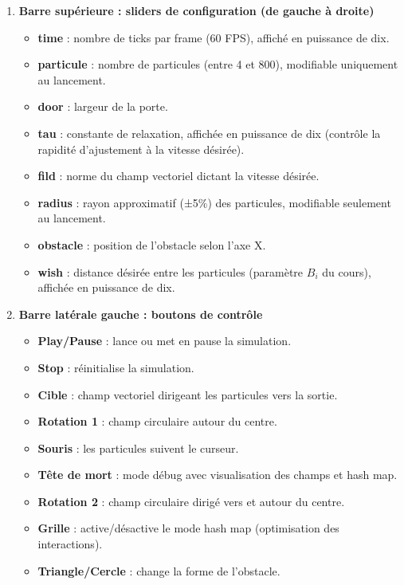 \documentclass[a4paper,12pt]{article}
\begin{document}
\begin{enumerate}
  \item \textbf{Barre supérieure : sliders de configuration (de gauche à droite)}
  \begin{itemize}
    \item \textbf{time} : nombre de ticks par frame (60 FPS), affiché en puissance de dix.
    \item \textbf{particule} : nombre de particules (entre 4 et 800), modifiable uniquement au lancement.
    \item \textbf{door} : largeur de la porte.
    \item \textbf{tau} : constante de relaxation, affichée en puissance de dix (contrôle la rapidité d’ajustement à la vitesse désirée).
    \item \textbf{fild} : norme du champ vectoriel dictant la vitesse désirée.
    \item \textbf{radius} : rayon approximatif (±5\%) des particules, modifiable seulement au lancement.
    \item \textbf{obstacle} : position de l’obstacle selon l’axe X.
    \item \textbf{wish} : distance désirée entre les particules (paramètre \( B_i \) du cours), affichée en puissance de dix.
  \end{itemize}

  \item \textbf{Barre latérale gauche : boutons de contrôle}
  \begin{itemize}
    \item \textbf{Play/Pause} : lance ou met en pause la simulation.
    \item \textbf{Stop} : réinitialise la simulation.
    \item \textbf{Cible} : champ vectoriel dirigeant les particules vers la sortie.
    \item \textbf{Rotation 1} : champ circulaire autour du centre.
    \item \textbf{Souris} : les particules suivent le curseur.
    \item \textbf{Tête de mort} : mode débug avec visualisation des champs et hash map.
    \item \textbf{Rotation 2} : champ circulaire dirigé vers et autour du centre.
    \item \textbf{Grille} : active/désactive le mode hash map (optimisation des interactions).
    \item \textbf{Triangle/Cercle} : change la forme de l’obstacle.
  \end{itemize}


\end{enumerate}
\end{document}
